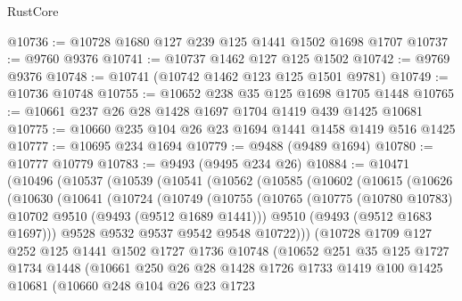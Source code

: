 \begin{lexlean}{RustCore}
\begin{coremodule}
@10736 := @10728 @1680 @127 @239 @125 @1441 @1502 @1698 @1707
@10737 := @9760 @9376
@10741 := @10737 @1462 @127 @125 @1502
@10742 := @9769 @9376
@10748 := @10741 (@10742 @1462 @123 @125 @1501 @9781)
@10749 := @10736 @10748
@10755 := @10652 @238 @35 @125 @1698 @1705 @1448
@10765 := @10661 @237 @26 @28 @1428 @1697 @1704 @1419 @439 @1425 @10681
@10775 := @10660 @235 @104 @26 @23 @1694 @1441 @1458 @1419 @516 @1425
@10777 := @10695 @234 @1694
@10779 := @9488 (@9489 @1694)
@10780 := @10777 @10779
@10783 := @9493 (@9495 @234 @26)
@10884 := @10471
    (@10496
      (@10537
        (@10539
          (@10541
            (@10562
              (@10585
                (@10602
                  (@10615
                    (@10626
                      (@10630
                        (@10641
                          (@10724
                            (@10749
                              (@10755
                                (@10765
                                  (@10775 (@10780 @10783) @10702 @9510 (@9493 (@9512 @1689 @1441)))
                                  @9510
                                  (@9493 (@9512 @1683 @1697)))
                                @9528
                                @9532
                                @9537
                                @9542
                                @9548
                                @10722)))
                          (@10728
                            @1709
                            @127
                            @252
                            @125
                            @1441
                            @1502
                            @1727
                            @1736
                            @10748
                            (@10652
                              @251
                              @35
                              @125
                              @1727
                              @1734
                              @1448
                              (@10661
                                @250
                                @26
                                @28
                                @1428
                                @1726
                                @1733
                                @1419
                                @100
                                @1425
                                @10681
                                (@10660
                                  @248
                                  @104
                                  @26
                                  @23
                                  @1723

\end{coremodule}
\end{lexlean}
